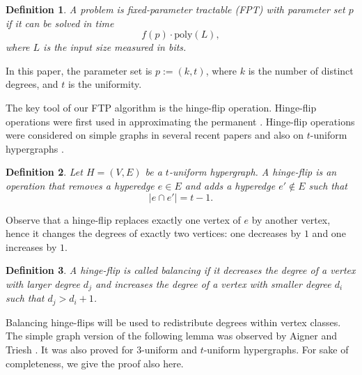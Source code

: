 \documentclass[pdflatex,sn-mathphys-num]{sn-jnl}%
\theoremstyle{thmstyleone}%
\theoremstyle{thmstyletwo}%
\theoremstyle{thmstylethree}%
\newtheorem{definition}{Definition}%
\begin{document}

\begin{definition}
A problem is \emph{fixed-parameter tractable (FPT)} with parameter set $p$ if it can be solved in time
\[
f(p)\cdot \mathrm{poly}(L),
\]
where $L$ is the input size measured in bits.
\end{definition}

In this paper, the parameter set is $p:= (k,t)$, where $k$ is the number of distinct degrees, and $t$ is the uniformity.



The key tool of our FTP algorithm is the hinge-flip operation. Hinge-flip operations were first used in approximating the permanent \cite{jerrumsinclair}.  Hinge-flip operations were considered on simple graphs in several recent papers \cite{RechnerStrowickMullerHannemann,AmanatidisKleer2023,ErdosMezeiMiklos} and also on $t$-uniform hypergraphs \cite{LiMiklos,LMMZ,MRZ}.

\begin{definition}
Let $H=(V,E)$ be a $t$-uniform hypergraph. A \emph{hinge-flip} is an operation that removes a hyperedge $e \in E$ and adds a hyperedge $e' \notin E$ such that
\[
|e \cap e'| = t-1.
\]
\end{definition}

Observe that a hinge-flip replaces exactly one vertex of $e$ by another vertex, hence it changes the degrees of exactly two vertices: one decreases by $1$ and one increases by $1$.

\begin{definition}
A hinge-flip is called \emph{balancing} if it decreases the degree of a vertex with larger degree $d_j$ and increases the degree of a vertex with smaller degree $d_i$ such that $d_j > d_i+1$.
\end{definition}

Balancing hinge-flips will be used to redistribute degrees within vertex classes. The simple graph version of the following lemma was observed by Aigner and Triesh \cite{AignerTriesh}. It was also proved for $3$-uniform \cite{LiMiklos} and $t$-uniform \cite{MRZ} hypergraphs. For sake of completeness, we give the proof also here.
\end{document}
